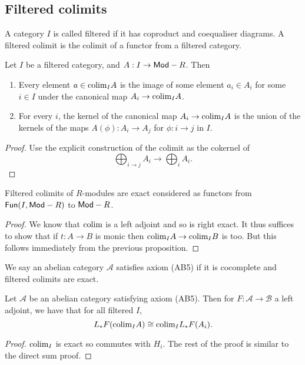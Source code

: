 \documentclass{memoir}
\begin{document}
\subsection{Filtered colimits}
\begin{definition}
    A category $I$ is called filtered if it has coproduct and coequaliser diagrams.
    A filtered colimit is the colimit of a functor from a filtered category.
\end{definition}
\begin{lemma}
    Let $I$ be a filtered category, and $A:I\to {\normalfont\mathsf{Mod}}-R$. Then
    \begin{enumerate}
        \item Every element $a\in\text{colim}_I A$ is the image of some element $a_i\in A_i$ for some $i\in I$ under the canonical map $A_i\to \text{colim}_I A$.
        \item For every $i$, the kernel of the canonical map $A_i\to \text{colim}_I A$ is the union of the kernels of the maps $A(\phi):A_i\to A_j$ for $\phi:i\to j$ in $I$.
    \end{enumerate}
\end{lemma}
\begin{proof}
    Use the explicit construction of the colimit as the cokernel of
    \begin{equation}
        \bigoplus_{i\to j}A_i \to \bigoplus_iA_i.
    \end{equation}
\end{proof}
\begin{thm}
    Filtered colimits of $R$-modules are exact considered as functors from ${\normalfont\mathsf{Fun}}(I,{\normalfont\mathsf{Mod}}-R)$ to ${\normalfont\mathsf{Mod}}-R$.
\end{thm}
\begin{proof}
    We know that $\text{colim}$ is a left adjoint and so is right exact. 
    It thus suffices to show that if $t:A\to B$ is monic then $\text{colim}_IA\to\text{colim}_IB$ is too.
    But this follows immediately from the previous proposition.
\end{proof}
\begin{definition}
    We say an abelian category $\mathcal A$ satisfies axiom (AB5) if it is cocomplete and filtered colimits are exact.
\end{definition}
\begin{thm}
    Let $\mathcal A$ be an abelian category satisfying axiom (AB5).
    Then for $F:\mathcal A\to \mathcal B$ a left adjoint, we have that for all filtered $I$,
    \begin{equation}
        L_*F(\text{colim}_IA) \cong \text{colim}_I L_*F(A_i).
    \end{equation}
\end{thm}
\begin{proof}
    $\text{colim}_I$ is exact so commutes with $H_i$.
    The rest of the proof is similar to the direct sum proof.
\end{proof}
\end{document}
